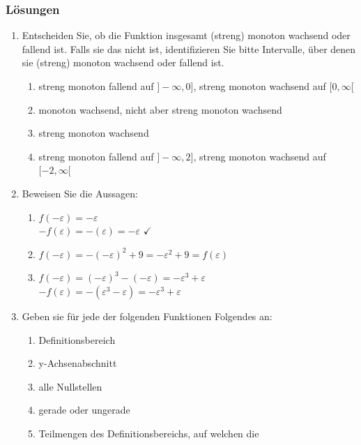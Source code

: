 \subsubsection{Lösungen}
\begin{enumerate}
    \item Entscheiden Sie, ob die Funktion insgesamt (streng) monoton wachsend oder fallend ist. Falls sie das nicht ist, identifizieren Sie bitte Intervalle, über denen sie (streng) monoton wachsend oder fallend ist.
          \begin{enumerate}
              \item streng monoton fallend auf $]-\infty, 0]$, streng monoton wachsend auf $[0,\infty[$
              \item monoton wachsend, nicht aber streng monoton wachsend
              \item streng monoton wachsend
              \item streng monoton fallend auf $]-\infty, 2]$, streng monoton wachsend auf $[-2,\infty[$
          \end{enumerate}
    \item Beweisen Sie die Aussagen:
          \begin{enumerate}
              \item $f(-\varepsilon)=-\varepsilon$\\
                    $-f(\varepsilon) = -(\varepsilon) = -\varepsilon$ $\checkmark$
              \item $f(-\varepsilon)=-(-\varepsilon)^2+9 = -\varepsilon^2 + 9 = f(\varepsilon)$ \checkmark
              \item $f(-\varepsilon)=(-\varepsilon)^3-(-\varepsilon) = -\varepsilon^3 + \varepsilon$\\
                    $-f(\varepsilon) = -(\varepsilon^3 -\varepsilon) = -\varepsilon^3 + \varepsilon$ \checkmark
          \end{enumerate}
    \item Geben sie für jede der folgenden Funktionen Folgendes an:
          \begin{enumerate}[label=\roman*)]
              \item Definitionsbereich
              \item y-Achsenabschnitt
              \item alle Nullstellen
              \item gerade oder ungerade
              \item Teilmengen des Definitionsbereichs, auf welchen die

\end{enumerate}
\end{enumerate}
